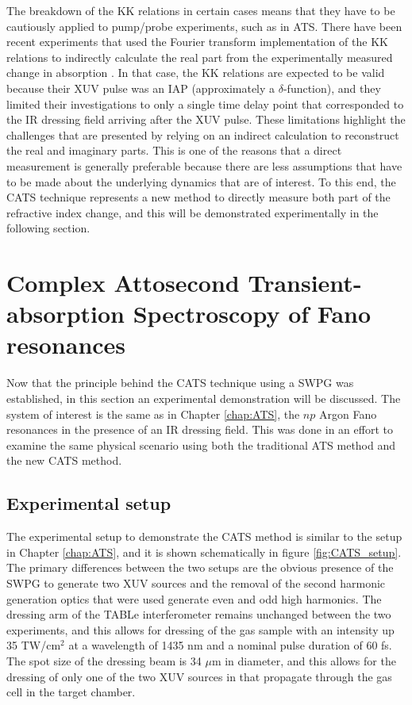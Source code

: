 The breakdown of the KK relations in certain cases means that they have to be cautiously applied to pump/probe experiments, such as in ATS.  There have been recent experiments that used the Fourier transform implementation of the KK relations \cite{petersonCausalityCalculationsTime1973} to indirectly calculate the real part from the experimentally measured change in absorption \cite{stoossRealTimeReconstructionStrongFieldDriven2018}.  In that case, the KK relations are expected to be valid because their XUV pulse was an IAP (approximately a $\delta$-function), and they limited their investigations to only a single time delay point that corresponded to the IR dressing field arriving after the XUV pulse.  These limitations highlight the challenges that are presented by relying on an indirect calculation to reconstruct the real and imaginary parts.  This is one of the reasons that a direct measurement is generally preferable because there are less assumptions that have to be made about the underlying dynamics that are of interest.  To this end, the CATS technique represents a new method to directly measure both part of the refractive index change, and this will be demonstrated experimentally in the following section.




\section{Complex Attosecond Transient-absorption Spectroscopy of Fano resonances}
\label{sec:CATS_ar}

Now that the principle behind the CATS technique using a SWPG was established, in this section an experimental demonstration will be discussed.  The system of interest is the same as in Chapter \ref{chap:ATS}, the $np$ Argon Fano resonances in the presence of an IR dressing field. This was done in an effort to examine the same physical scenario using both the traditional ATS method and the new CATS method.

\subsection{Experimental setup}
\label{sec:CATS_ar_exp_setup}

The experimental setup to demonstrate the CATS method is similar to the setup in Chapter \ref{chap:ATS}, and it is shown schematically in figure \ref{fig:CATS_setup}.  The primary differences between the two setups are the obvious presence of the SWPG to generate two XUV sources and the removal of the second harmonic generation optics that were used generate even and odd  high harmonics.  The dressing arm of the TABLe interferometer remains unchanged between the two experiments, and this allows for dressing of the gas sample with an intensity up 35 TW/cm$^2$ at a wavelength of 1435 nm and a nominal pulse duration of 60 fs. The spot size of the dressing beam is 34 $\mu$m in diameter, and this allows for the dressing of only one of the two XUV sources in that propagate through the gas cell in the target chamber.

